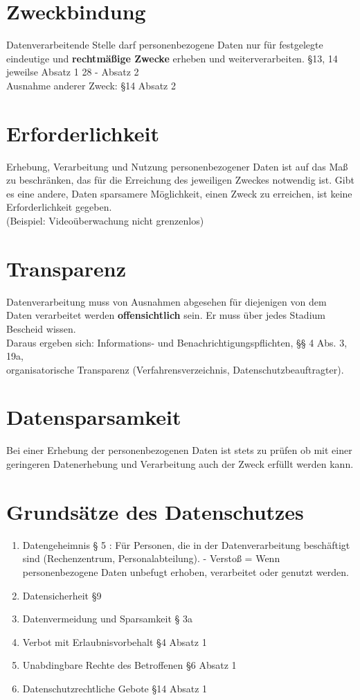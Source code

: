 \documentclass[a4paper,10pt]{scrartcl}
\begin{document}
\section{Zweckbindung}

Datenverarbeitende Stelle darf personenbezogene Daten nur für festgelegte eindeutige und
\textbf{rechtmäßige Zwecke} erheben und weiterverarbeiten. §13, 14 jeweilse Absatz 1 
28 - Absatz 2\\

Ausnahme anderer Zweck: §14 Absatz 2

\section{Erforderlichkeit}
Erhebung, Verarbeitung und Nutzung personenbezogener Daten 
ist auf das Maß zu beschränken, das für die Erreichung des 
jeweiligen Zweckes notwendig ist. Gibt es eine andere, 
Daten sparsamere Möglichkeit, einen Zweck zu erreichen, ist 
keine Erforderlichkeit gegeben.\\

(Beispiel: Videoüberwachung nicht grenzenlos)  

\section{Transparenz}
Datenverarbeitung muss von Ausnahmen abgesehen für diejenigen von dem Daten verarbeitet werden \textbf{offensichtlich} sein. Er muss über jedes Stadium
Bescheid wissen.\\
Daraus ergeben sich: Informations- und Benachrichtigungspflichten,
§§ 4 Abs. 3, 19a,\\
organisatorische Transparenz (Verfahrensverzeichnis, Datenschutzbeauftragter).

\section{Datensparsamkeit}

Bei einer Erhebung der personenbezogenen Daten ist stets zu prüfen ob mit einer geringeren Datenerhebung und Verarbeitung auch der Zweck erfüllt
werden kann.

\section{Grundsätze des Datenschutzes}
\begin{enumerate}
 \item Datengeheimnis § 5 : Für Personen, die in der Datenverarbeitung beschäftigt sind 
(Rechenzentrum, Personalabteilung). - Verstoß = Wenn personenbezogene Daten unbefugt erhoben, verarbeitet 
oder genutzt werden.
 \item Datensicherheit §9
 \item Datenvermeidung und Sparsamkeit § 3a 
 \item Verbot mit Erlaubnisvorbehalt §4 Absatz 1
 \item Unabdingbare Rechte des Betroffenen §6 Absatz 1
 \item Datenschutzrechtliche Gebote §14 Absatz 1
\end{enumerate}
\end{document}
